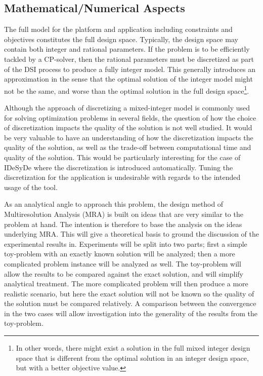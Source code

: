 \documentclass[12pt,notitlepage]{article}
\begin{document}
\subsection{Mathematical/Numerical Aspects}
The full model for the platform and application including constraints and objectives constitutes the full design space. Typically, the design space may contain both integer and rational parameters. If the problem is to be efficiently tackled by a CP-solver, then the rational parameters must be discretized as part of the DSI process to produce a fully integer model. This generally introduces an approximation in the sense that the optimal solution of the integer model might not be the same, and worse than the optimal solution in the full design space\footnote{In other words, there might exist a solution in the full mixed integer design space that is different from the optimal solution in an integer design space, but with a better objective value.}.

Although the approach of discretizing a mixed-integer model is commonly used for solving optimization problems in several fields, the question of how the choice of discretization impacts the quality of the solution is not well studied. It would be very valuable to have an understanding of how the discretization impacts the quality of the solution, as well as the trade-off between computational time and quality of the solution. This would be particularly interesting for the case of IDeSyDe where the discretization is introduced automatically. Tuning the discretization for the application is undesirable with regards to the intended usage of the tool.

As an analytical angle to approach this problem, the design method of Multiresolution Analysis (MRA) is built on ideas that are very similar to the problem at hand. The intention is therefore to base the analysis on the ideas underlying MRA. This will give a theoretical basis to ground the discussion of the experimental results in. Experiments will be split into two parts; first a simple toy-problem with an exactly known solution will be analyzed; then a more complicated problem instance will be analyzed as well. The toy-problem will allow the results to be compared against the exact solution, and will simplify analytical treatment. The more complicated problem will then produce a more realistic scenario, but here the exact solution will not be known so the quality of the solution must be compared relatively. A comparison between the convergence in the two cases will allow investigation into the generality of the results from the toy-problem.
\end{document}
